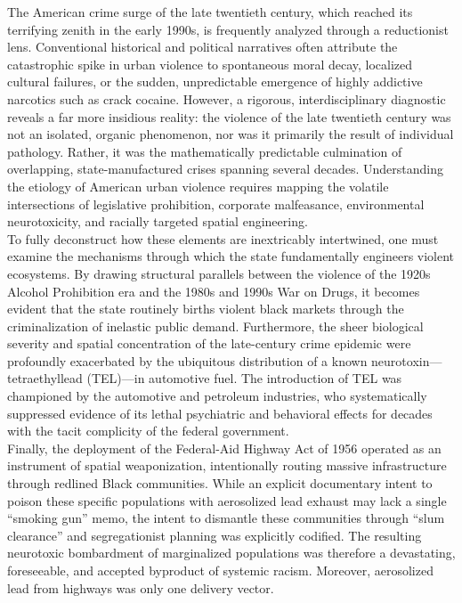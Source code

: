 \documentclass[
]{article}
\begin{document}
The American crime surge of the late twentieth century, which reached
its terrifying zenith in the early 1990s, is frequently analyzed through
a reductionist lens. Conventional historical and political narratives
often attribute the catastrophic spike in urban violence to spontaneous
moral decay, localized cultural failures, or the sudden, unpredictable
emergence of highly addictive narcotics such as crack cocaine. However,
a rigorous, interdisciplinary diagnostic reveals a far more insidious
reality: the violence of the late twentieth century was not an isolated,
organic phenomenon, nor was it primarily the result of individual
pathology. Rather, it was the mathematically predictable culmination of
overlapping, state-manufactured crises spanning several decades.
Understanding the etiology of American urban violence requires mapping
the volatile intersections of legislative prohibition, corporate
malfeasance, environmental neurotoxicity, and racially targeted spatial
engineering.\\
To fully deconstruct how these elements are inextricably intertwined,
one must examine the mechanisms through which the state fundamentally
engineers violent ecosystems. By drawing structural parallels between
the violence of the 1920s Alcohol Prohibition era and the 1980s and
1990s War on Drugs, it becomes evident that the state routinely births
violent black markets through the criminalization of inelastic public
demand. Furthermore, the sheer biological severity and spatial
concentration of the late-century crime epidemic were profoundly
exacerbated by the ubiquitous distribution of a known
neurotoxin---tetraethyllead (TEL)---in automotive fuel. The introduction
of TEL was championed by the automotive and petroleum industries, who
systematically suppressed evidence of its lethal psychiatric and
behavioral effects for decades with the tacit complicity of the federal
government.\\
Finally, the deployment of the Federal-Aid Highway Act of 1956 operated
as an instrument of spatial weaponization, intentionally routing massive
infrastructure through redlined Black communities. While an explicit
documentary intent to poison these specific populations with aerosolized
lead exhaust may lack a single ``smoking gun'' memo, the intent to
dismantle these communities through ``slum clearance'' and
segregationist planning was explicitly codified. The resulting
neurotoxic bombardment of marginalized populations was therefore a
devastating, foreseeable, and accepted byproduct of systemic racism.
Moreover, aerosolized lead from highways was only one delivery vector.
\end{document}
